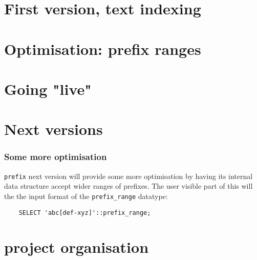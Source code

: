 \documentclass{beamer}
\begin{document}
\section{First version, text indexing}


\section{Optimisation: prefix ranges}


\section{Going "live"}


\section{Next versions}

\begin{frame}[fragile]
  \frametitle{Some more optimisation}
  
  \texttt{prefix} next version will provide some more optimisation
  by having its internal data structure accept wider ranges of prefixes.
  The user visible part of this will the the input format of the \texttt{prefix\_range}
  datatype:
  
  \begin{example}
  \begin{verbatim}
    SELECT 'abc[def-xyz]'::prefix_range;
  \end{verbatim}
  \end{example}
\end{frame}

\section{project organisation}

\end{document}
